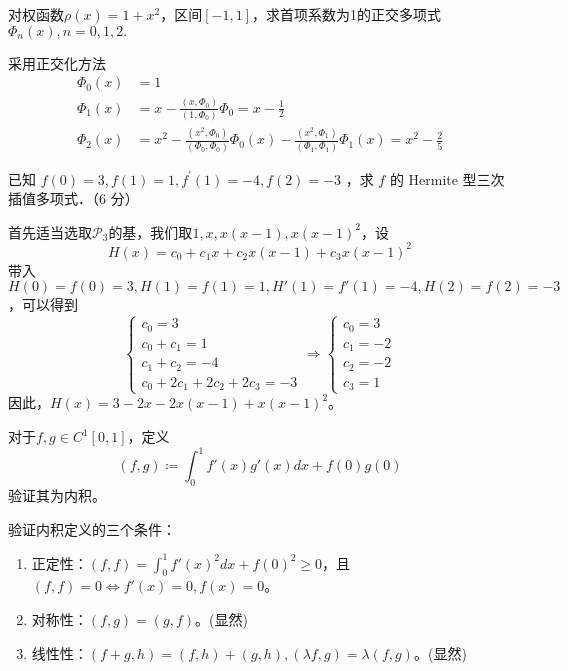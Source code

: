 \begin{exercise}
    对权函数$\rho(x)=1+x^2$，区间$[-1,1]$，求首项系数为1的正交多项式$\Phi_n(x),n=0,1,2.$
\end{exercise}
\begin{solution}
    采用正交化方法
    \begin{align*}
        \Phi_0(x) & =1                                                                                                               \\
        \Phi_1(x) & =x-\frac{(x,\Phi_0)}{(1,\Phi_0)}\Phi_0=x-\frac{1}{2}                                                             \\
        \Phi_2(x) & =x^2-\frac{(x^2,\Phi_0)}{(\Phi_0,\Phi_0)}\Phi_0(x)-\frac{(x^2,\Phi_1)}{(\Phi_1,\Phi_1)}\Phi_1(x)=x^2-\frac{2}{5}
    \end{align*}
\end{solution}

\begin{exercise}
    已知 $f(0)=3, f(1)=1, f^{\prime}(1)=-4, f(2)=-3$ ，求 $f$ 的 Hermite 型三次插值多项式．（6 分）
\end{exercise}
\begin{solution}
    首先适当选取$\mathcal{P}_3$的基，我们取$1,x,x(x-1),x(x-1)^2$，设
    \[
        H(x)=c_0+c_1x+c_2x(x-1)+c_3x(x-1)^2
    \]
    带入$H(0)=f(0)=3,H(1)=f(1)=1,H'(1)=f'(1)=-4,H(2)=f(2)=-3$，可以得到
    \[
        \begin{cases}
            c_0=3      \\
            c_0+c_1=1  \\
            c_1+c_2=-4 \\
            c_0+2c_1+2c_2+2c_3=-3
        \end{cases}\Rightarrow \begin{cases}
            c_0=3  \\
            c_1=-2 \\
            c_2=-2 \\
            c_3=1
        \end{cases}
    \]
    因此，$H(x)=3-2x-2x(x-1)+x(x-1)^2$。
\end{solution}

\begin{exercise}
    对于$f,g\in C^1[0,1]$，定义
    \[(f,g)\coloneqq \int_0^1f'(x)g'(x)dx+f(0)g(0)\]
    验证其为内积。
\end{exercise}
\begin{solution}
    验证内积定义的三个条件：
    \begin{enumerate}
        \item 正定性：$(f,f)=\int_0^1f'(x)^2dx+f(0)^2\geq 0$，且$(f,f)=0\Leftrightarrow f'(x)=0,f(x)=0$。
        \item 对称性：$(f,g)=(g,f)$。(显然)
        \item 线性性：$(f+g,h)=(f,h)+(g,h),(\lambda f,g)=\lambda(f,g)$。(显然)
    \end{enumerate}
\end{solution}

